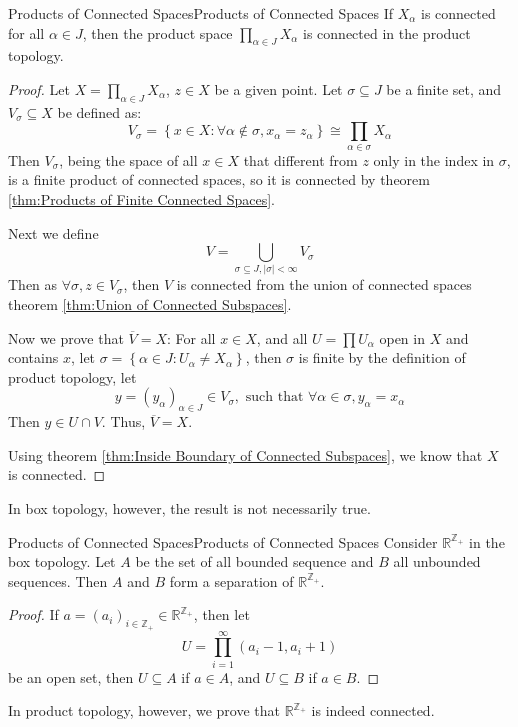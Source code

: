 \documentclass[../main.tex]{subfiles}
\begin{document}
\begin{theorem}{Products of Connected Spaces}{Products of Connected Spaces}
	If $X_{\alpha}$ is connected for all $\alpha \in J$, then the product space $\prod_{\alpha \in J} X_{\alpha}$ is connected in the product topology.
\end{theorem}
\begin{proof}
Let $X = \prod_{\alpha \in J} X_{\alpha}$, $z\in X$ be a given point. Let $\sigma \subseteq J$ be a finite set, and $V_{\sigma} \subseteq X$ be defined as:
\begin{equation*}
	V_{\sigma} = \left\{ x\in X: \forall \alpha \notin \sigma, x_{\alpha} = z_{\alpha} \right\} \cong \prod_{\alpha \in \sigma} X_{\alpha}
\end{equation*}
Then $V_{\sigma}$, being the space of all $x\in X$ that different from $z$ only in the index in $\sigma$, is a finite product of connected spaces, so it is connected by theorem \ref{thm:Products of Finite Connected Spaces}.

Next we define
\begin{equation*}
V = \bigcup_{\sigma \subseteq J, |\sigma| < \infty } V_{\sigma} 
\end{equation*}
Then as $\forall \sigma, z\in V_{\sigma}$, then $V$ is connected from the union of connected spaces theorem \ref{thm:Union of Connected Subspaces}. 

Now we prove that $\overline{V} = X$: For all $x\in X$, and all $U = \prod U_{\alpha}$ open in $X$ and contains $x$, let $\sigma = \left\{ \alpha\in J : U_{\alpha} \neq X_{\alpha} \right\}$, then $\sigma$ is finite by the definition of product topology, let
\begin{equation*}
	y = (y_{\alpha})_{\alpha \in J} \in V_{\sigma}, \text{ such that } \forall \alpha\in \sigma, y_{\alpha} = x_{\alpha}
\end{equation*}
Then $y\in U\cap V$. Thus, $\overline{V} = X$. 

Using theorem \ref{thm:Inside Boundary of Connected Subspaces}, we know that $X$ is connected.
\end{proof}


In box topology, however, the result is not necessarily true.
\begin{example}{Products of Connected Spaces}{Products of Connected Spaces}
	Consider $\mathbb{R}^{\mathbb{Z}_+}$ in the box topology. Let $A$ be the set of all bounded sequence and $B$ all unbounded sequences. Then $A$ and $B$ form a separation of $\mathbb{R}^{\mathbb{Z}_+}$.
\begin{proof}
If $a = (a_i)_{i\in \mathbb{Z}_+} \in \mathbb{R}^{\mathbb{Z}_+}$, then let
\begin{equation*}
U = \prod_{i=1}^{\infty } (a_i-1,a_i+1)
\end{equation*}
be an open set, then $U \subseteq A$ if $a\in A$, and $U \subseteq B$ if $a\in B$.
\end{proof}

In product topology, however, we prove that $\mathbb{R}^{\mathbb{Z}_+}$ is indeed connected.
\end{example}
\end{document}
